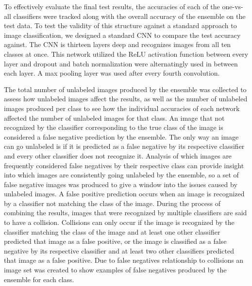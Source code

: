 \documentclass[10pt,twocolumn,letterpaper]{article}
\begin{document}
To effectively evaluate the final test results, the accuracies of each of the one-vs-all classifiers were tracked along with the overall accuracy of the ensemble on the test data. To test the validity of this structure against a standard approach to image classification, we designed a standard CNN to compare the test accuracy against. The CNN is thirteen layers deep and recognizes images from all ten classes at once. This network utilized the ReLU activation function between every layer and dropout and batch normalization were alternatingly used in between each layer. A max pooling layer was used after every fourth convolution.

The total number of unlabeled images produced by the ensemble was collected to assess how unlabeled images affect the results, as well as the number of unlabeled images produced per class to see how the individual accuracies of each network affected the number of unlabeled images for that class. An image that not recognized by the classifier corresponding to the true class of the image is considered a false negative prediction by the ensemble. The only way an image can go unlabeled is if it is predicted as a false negative by its respective classifier and every other classifier does not recognize it. Analysis of which images are frequently considered false negatives by their respective class can provide insight into which images are consistently going unlabeled by the ensemble, so a set of false negative images was produced to give a window into the issues caused by unlabeled images. A false positive prediction occurs when an image is recognized by a classifier not matching the class of the image. During the process of combining the results, images that were recognized by multiple classifiers are said to have a collision.  Collisions can only occur if the image is recognized by the classifier matching the class of the image and at least one other classifier predicted that image as a false positive, or the image is classified as a false negative by its respective classifier and at least two other classifiers predicted that image as a false positive. Due to false negatives relationship to collisions an image set was created to show examples of false negatives produced by the ensemble for each class.
\end{document}
